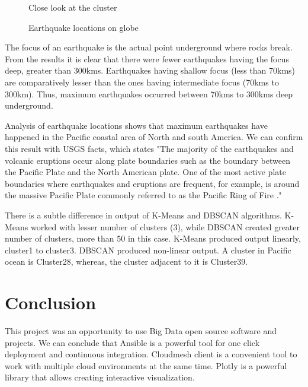 \documentclass[9pt,twocolumn,twoside]{../../styles/osajnl}
\begin{document}
\begin{figure}[htbp]
\centering
{}
\caption{Close look at the cluster} 
\label{fig:figure6}
\end{figure}


\begin{figure}[htbp]
\centering
{}
\caption{Earthquake locations on globe} 
\label{fig:figure7}
\end{figure}

The focus of an earthquake is the actual point underground where rocks break. From the results it is clear that there were fewer earthquakes having the focus deep, greater than 300kms. Earthquakes having shallow focus (less than 70kms) are comparatively lesser than the ones having intermediate focus (70kms to 300km). Thus, maximum earthquakes occurred between 70kms to 300kms deep underground.

Analysis of earthquake locations shows that maximum earthquakes have happened in the Pacific coastal area of North and south America. We can confirm this result with USGS facts, which states "The majority of the earthquakes and volcanic eruptions occur along plate boundaries such as the boundary between the Pacific Plate and the North American plate. One of the most active plate boundaries where earthquakes and eruptions are frequent, for example, is around the massive Pacific Plate commonly referred to as the Pacific Ring of Fire \cite{www-usgs4}."

There is a subtle difference in output of K-Means and DBSCAN algorithms. K-Means worked with lesser number of clusters (3), while DBSCAN created greater number of clusters, more than 50 in this case. K-Means produced output linearly, cluster1 to cluster3. DBSCAN produced non-linear output. A cluster in Pacific ocean is Cluster28, whereas, the cluster adjacent to it is Cluster39.  


\section {Conclusion}
This project was an opportunity to use Big Data open source software and projects. 
We can conclude that Ansible is a powerful tool for one click deployment and continuous integration. Cloudmesh client is a convenient tool to work with multiple cloud environments at the same time. Plotly is a powerful library that allows creating interactive visualization. 
\end{document}
